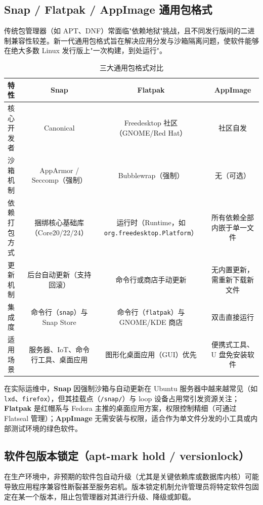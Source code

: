 \documentclass[12pt,UTF8]{ctexbook}
\begin{document}
\subsection{Snap / Flatpak / AppImage 通用包格式}

传统包管理器（如 APT、DNF）常面临"依赖地狱"挑战，且不同发行版间的二进制兼容性较差。新一代通用包格式旨在解决应用分发与沙箱隔离问题，使软件能够在绝大多数 Linux 发行版上"一次构建，到处运行"。

\begin{table}[htbp]
	\centering
	\caption{三大通用包格式对比}
	\begin{tabular}{@{}lccc@{}}
		\toprule
		\textbf{特性} & \textbf{Snap} & \textbf{Flatpak} & \textbf{AppImage} \\
		\midrule
		核心开发者 & Canonical &  Freedesktop 社区（GNOME/Red Hat） & 社区自发 \\
		沙箱机制 & AppArmor / Seccomp（强制） & Bubblewrap（强制） & 无（可选） \\
		依赖打包方式 & 捆绑核心基础库（Core20/22/24） & 运行时（Runtime，如 \texttt{org.freedesktop.Platform}） & 所有依赖全部内嵌于单一文件 \\
		更新机制 & 后台自动更新（支持回滚） & 命令行或商店手动更新 & 无内置更新，需重新下载新文件 \\
		集成度 & 命令行（\texttt{snap}）与 Snap Store & 命令行（\texttt{flatpak}）与 GNOME/KDE 商店 & 双击直接运行 \\
		适用场景 & 服务器、IoT、命令行工具、桌面应用 & 图形化桌面应用（GUI）优先 & 便携式工具、U 盘免安装软件 \\
		\bottomrule
	\end{tabular}
\end{table}

在实际运维中，\textbf{Snap} 因强制沙箱与自动更新在 Ubuntu 服务器中越来越常见（如 \texttt{lxd}、\texttt{firefox}），但其挂载点（\texttt{/snap/}）与 loop 设备占用常引发资源关注；\textbf{Flatpak} 是红帽系与 Fedora 主推的桌面应用方案，权限控制精细（可通过 Flatseal 管理）；\textbf{AppImage} 无需安装与权限，适合作为单文件分发的小工具或内部测试环境的绿色软件。

\subsection{软件包版本锁定（apt-mark hold / versionlock）}

在生产环境中，非预期的软件包自动升级（尤其是关键依赖库或数据库内核）可能导致应用程序兼容性断裂甚至服务宕机。版本锁定机制允许管理员将特定软件包固定在某一个版本，阻止包管理器对其进行升级、降级或卸载。
\end{document}
